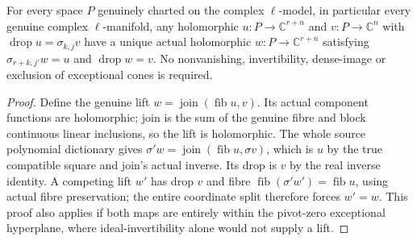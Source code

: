 \begin{theorem}
\label{hir:submersion-monomial-chart-cartesian}
\leanok
{}
For every space $P$ genuinely charted on the complex $\ell$-model, in particular every genuine complex $\ell$-manifold, any holomorphic $u:P\to\mathbb C^{r+n}$ and $v:P\to\mathbb C^n$ with $\operatorname{drop}u=\sigma_{k,j}v$ have a unique actual holomorphic $w:P\to\mathbb C^{r+n}$ satisfying $\sigma_{r+k,j'}w=u$ and $\operatorname{drop}w=v$. No nonvanishing, invertibility, dense-image or exclusion of exceptional cones is required.
\end{theorem}
\begin{proof}
Define the genuine lift $w=\operatorname{join}(\operatorname{fib}u,v)$. Its actual component functions are holomorphic; join is the sum of the genuine fibre and block continuous linear inclusions, so the lift is holomorphic. The whole source polynomial dictionary gives $\sigma' w=\operatorname{join}(\operatorname{fib}u,\sigma v)$, which is $u$ by the true compatible square and join's actual inverse. Its drop is $v$ by the real inverse identity. A competing lift $w'$ has drop $v$ and fibre $\operatorname{fib}(\sigma' w')=\operatorname{fib}u$, using actual fibre preservation; the entire coordinate split therefore forces $w'=w$. This proof also applies if both maps are entirely within the pivot-zero exceptional hyperplane, where ideal-invertibility alone would not supply a lift.
\end{proof}

